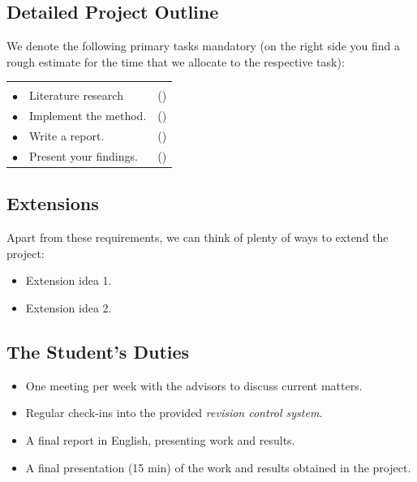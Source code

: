 \documentclass[a4paper,10pt]{article}
\newenvironment{reqlist}{\par \medskip \noindent \begin{tabular}{cp{0.83\textwidth}r} \\[-24pt]}{\end{tabular}}
\newcommand\req{\\ \smallskip \smallskip \hspace{0.24cm} $\bullet$\hspace{-0.2cm} & }
\newcounter{num}
\newcommand\effort[1]{\mbox{(\forloop{num}{0}{\value{num} < #1}{$\star$})}}
\begin{document}
\printbibliography

\newpage

\subsection*{Detailed Project Outline}
We denote the following primary tasks mandatory (on the right side you find a rough estimate for the time that we allocate to the respective task):
\begin{reqlist}
	\req Literature research & \effort{1}
	\req Implement the method. & \effort{3}
    \req Write a report. & \effort{2}
	\req Present your findings. & \effort{1}
\end{reqlist}

\subsection*{Extensions}
\noindent Apart from these requirements, we can think of plenty of ways to extend the project:
\begin{itemize}
	\item Extension idea 1.
	\item Extension idea 2.
\end{itemize}

\subsection*{The Student's Duties}
\begin{itemize}
	\item One meeting per week with the advisors to discuss current matters.
	\item Regular check-ins into the provided \emph{revision control system}.
	\item A final report in English, presenting work and results.
	\item A final presentation (15 min) of the work and results obtained in the project.
\end{itemize}
\end{document}
